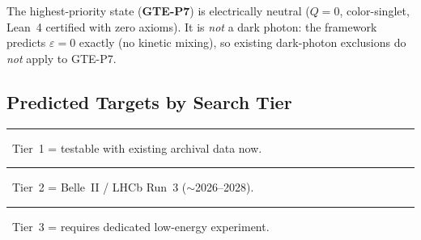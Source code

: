 The highest-priority state (\textbf{GTE-P7}) is electrically neutral ($Q=0$,
color-singlet, Lean~4 certified with zero axioms).  It is \emph{not} a dark
photon: the framework predicts $\varepsilon=0$ exactly (no kinetic mixing), so
existing dark-photon exclusions do \emph{not} apply to GTE-P7.

\bigskip

\subsection*{Predicted Targets by Search Tier}

\noindent
\textcolor{tier1}{\rule{1em}{0.8em}}~Tier~1 = testable with existing archival data now.\quad
\textcolor{tier2}{\rule{1em}{0.8em}}~Tier~2 = Belle~II / LHCb Run~3 ($\sim$2026--2028).\quad
\textcolor{tier3}{\rule{1em}{0.8em}}~Tier~3 = requires dedicated low-energy experiment.

\medskip

